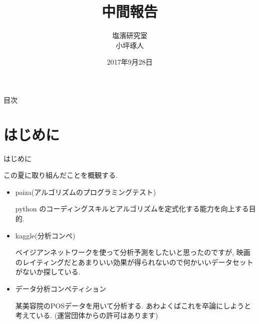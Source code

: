 \documentclass[dvipdfmx]{beamer}
\title[タイトル]{中間報告}
\author[発表者名]{塩濱研究室\\小坪琢人}
\institute[所属]{東京理科大学\ 工学部経営工学科4年\\学籍番号 4414036}
\date[日付]{2017年9月28日}
\begin{document}
\begin{frame}[plain]
\titlepage
\end{frame}
	
\begin{frame}{目次}
\tableofcontents
\end{frame}

\section{はじめに}
\begin{frame}{はじめに}

この夏に取り組んだことを概観する.

\begin{itemize}

\item paiza(アルゴリズムのプログラミングテスト)

python のコーディングスキルとアルゴリズムを定式化する能力を向上する目的.

\item kaggle(分析コンペ)

ベイジアンネットワークを使って分析予測をしたいと思ったのですが, 映画のレイティングだとあまりいい効果が得られないので何かいいデータセットがないか探している.

\item データ分析コンペティション

某美容院のPOSデータを用いて分析する. あわよくばこれを卒論にしようと考えている. (運営団体からの許可はあります)

\end{itemize}
\end{frame}
\end{document}
